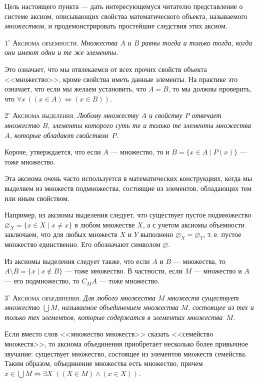 Цель настоящего пункта --- дать интересующемуся читателю представление о системе аксиом, описывающих свойства математического объекта, называемого \textit{множеством}, и продемонстрировать простейшие
следствия этих аксиом.

$1^\circ$ \textsc{Аксиома объемности}. \textit{Множества $A$ и $B$ равны тогда и только тогда, когда они имеют одни и те же элементы.}

Это означает, что мы отвлекаемся от всех прочих свойств объекта <<множество>>,
кроме свойства иметь данные элементы. На практике это означает, что если мы
желаем установить, что $A = B$, то мы должны проверить, что $\forall x\, ((x \in A) \Leftrightarrow (x \in B))$.

$2^\circ$ \textsc{Аксиома выделения}. \textit{Любому множеству $A$ и свойству $P$ отвечает множество $B$, элементы которого суть те и только те элементы множества $A$, которые
обладают свойством~$P$.}

Короче, утверждается, что если $A$ --- множество, то и $B = \{x \in A \mid P(x)\}$ --- тоже
множество.

Эта аксиома очень часто используется в математических конструкциях, когда мы
выделяем из множеств подмножества, состоящие из элементов, обладающих тем или
иным свойством.

Например, из аксиомы выделения следует, что существует пустое подмножество
$\varnothing_X = \{x \in X \mid x \neq x\}$ в любом множестве $X$, а с учетом аксиомы объемности
заключаем, что для любых множеств $X$ и $Y$ выполнено $\varnothing_X = \varnothing_Y$, т.\,е. пустое
множество единственно. Его обозначают символом $\varnothing$.

Из аксиомы выделения следует также, что если $A$ и $B$ --- множества, то
$A \setminus B = \{x \mid x \notin B\}$ --- тоже множество. В частности, если $M$ --- множество и $A$ --- его подмножество, то $C_M A$ --- тоже множество.

$3^\circ$ \textsc{Аксиома объединения}. \textit{Для любого множества $M$ множеств существует множество $\bigcup M$, называемое объединением множества $M$, состоящее из тех и только
тех элементов, которые содержатся в элементах множества~$M$.}

Если вместо слов <<множество множеств>> сказать <<семейство множеств>>, то
аксиома объединения приобретает несколько более привычное звучание: существует
множество, состоящее из элементов множеств семейства. Таким образом, объединение множества есть множество, причем $x \in \bigcup M \Leftrightarrow \exists X\; ((X \in M) \land (x \in X))$.

